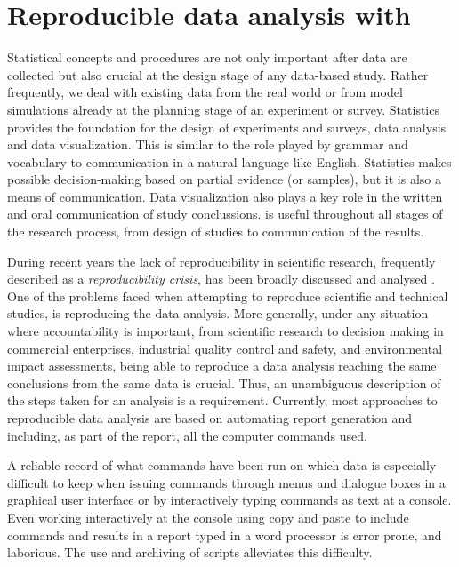 \documentclass[krantz2]{krantz}\usepackage{knitr}
\begin{document}
\section{Reproducible data analysis with \Rlang}
Statistical concepts and procedures are not only important after data are collected but also crucial at the design stage of any data-based study. Rather frequently, we deal with existing data from the real world or from model simulations already at the planning stage of an experiment or survey. Statistics provides the foundation for the design of experiments and surveys, data analysis and data visualization. This is similar to the role played by grammar and vocabulary to communication in a natural language like English. Statistics makes possible decision-making based on partial evidence (or samples), but it is also a means of communication. Data visualization also plays a key role in the written and oral communication of study conclussions. \Rlang is useful throughout all stages of the research process, from design of studies to communication of the results.

During recent years the lack of reproducibility in scientific research, frequently described as a \emph{reproducibility crisis}, has been broadly discussed and analysed \autocite{Gandrud2015}. One of the problems faced when attempting to reproduce scientific and technical studies, is reproducing the data analysis. More generally, under any situation where accountability is important, from scientific research to decision making in commercial enterprises, industrial quality control and safety, and environmental impact assessments, being able to reproduce a data analysis reaching the same conclusions from the same data is crucial. Thus, an unambiguous description of the steps taken for an analysis is a requirement. Currently, most approaches to reproducible data analysis are based on automating report generation and including, as part of the report, all the computer commands used.

A reliable record of what commands have been run on which data is especially difficult to keep when issuing commands through menus and dialogue boxes in a graphical user interface or by interactively typing commands as text at a console. Even working interactively at the \Rpgrm console using copy and paste to include commands and results in a report typed in a word processor is error prone, and laborious. The use and archiving of \Rlang scripts alleviates this difficulty.
\end{document}
